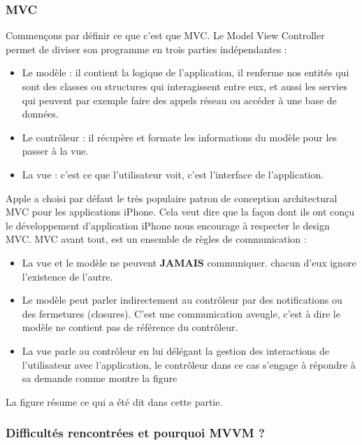 \subsubsection{MVC} %
 \label{ssub:mvc}
 Commençons par définir ce que c'est que MVC. Le Model View Controller permet de diviser son programme en trois parties indépendantes :
 \begin{itemize}
 	\item Le modèle : il contient la logique de l'application, il renferme nos entités qui sont des classes ou structures qui interagissent entre eux, et aussi les servies qui peuvent par exemple faire des appels réseau ou accéder à une base de données.
 	\item Le contrôleur : il récupère  et formate les informations du modèle pour les passer à la vue.
 	\item La vue : c'est ce que l'utilisateur voit, c'est l'interface de l'application.
 \end{itemize}
 Apple a choisi par défaut le très populaire patron de conception architectural MVC pour les applications iPhone. Cela veut dire que la façon dont ils ont conçu le développement d'application iPhone nous encourage à respecter le design MVC. \newline
 MVC avant tout, est un ensemble de règles de communication :
 \begin{itemize}
 	\item La vue et le modèle ne peuvent \textbf{JAMAIS} communiquer. chacun d'eux ignore l’existence de l'autre.
 	\item Le modèle peut parler indirectement au contrôleur par des notifications ou des fermetures (closures). C'est une communication aveugle, c'est à dire le modèle ne contient pas de référence du contrôleur.
 	\item La vue parle au contrôleur en lui délégant la gestion des interactions de l'utilisateur avec l'application, le contrôleur dans ce cas s'engage à répondre à sa demande comme montre la figure 
 \end{itemize}
 La figure résume ce qui a été dit dans cette partie.

 \subsubsection{Difficultés rencontrées et pourquoi MVVM ?} %
 \label{ssub:difficultés_rencontrées_et_pourquoi_mvvm_}
 
